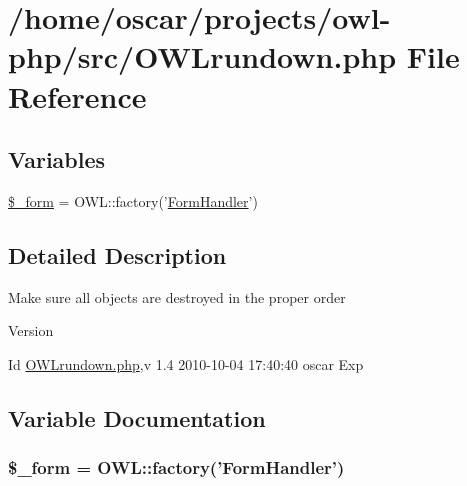 \section{/home/oscar/projects/owl-\/php/src/OWLrundown.php File Reference}
\label{OWLrundown_8php}
\subsection*{Variables}
\begin{DoxyCompactItemize}
\item 
\hyperlink{OWLrundown_8php_ab14b242803551e0f269742a7103f149d}{\$\_\-form} = OWL::factory('\hyperlink{classFormHandler}{FormHandler}')
\end{DoxyCompactItemize}


\subsection{Detailed Description}
Make sure all objects are destroyed in the proper order \begin{DoxyVersion}{Version}

\end{DoxyVersion}
\begin{DoxyParagraph}{Id}
\hyperlink{OWLrundown_8php}{OWLrundown.php},v 1.4 2010-\/10-\/04 17:40:40 oscar Exp 
\end{DoxyParagraph}


\subsection{Variable Documentation}
\subsubsection[{\$\_\-form}]{\setlength{\rightskip}{0pt plus 5cm}\$\_\-form = OWL::factory('{\bf FormHandler}')}\label{OWLrundown_8php_ab14b242803551e0f269742a7103f149d}
